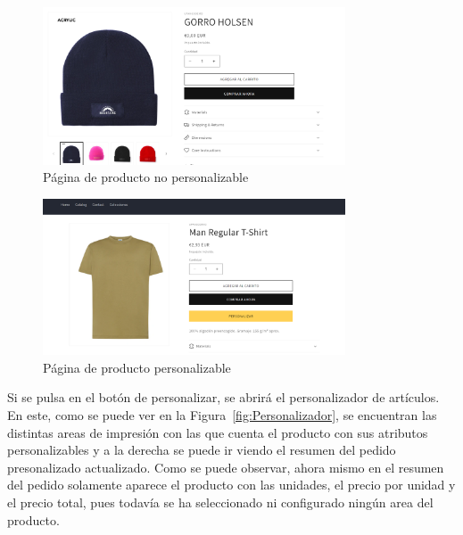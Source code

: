 \documentclass[12pt]{article}
\begin{document}
\begin{figure}[ht]
    \centering
    \includegraphics[width=0.8\textwidth]{imagenes/ManualUsuario/PaginaProductoSinPersonalizacion.png}
    \caption{\label{fig:ProductoNoPersonalizable}Página de producto no personalizable}
    \vspace{\fill}
\end{figure}

\begin{figure}[ht]
    \centering
    \includegraphics[width=0.8\textwidth]{imagenes/ManualUsuario/PaginaProductoConPersonalizacion.png}
    \caption{\label{fig:ProductoPersonalizable}Página de producto personalizable}
    \vspace{\fill}
\end{figure}

Si se pulsa en el botón de personalizar, se abrirá el personalizador de artículos. En este, como se puede ver en la Figura~\ref{fig:Personalizador}, se encuentran
las distintas areas de impresión con las que cuenta el producto con sus atributos personalizables y a la derecha se puede ir viendo el resumen del pedido presonalizado actualizado.
Como se puede observar, ahora mismo en el resumen del pedido solamente aparece el producto con las unidades, el precio por unidad y el precio total, pues todavía se ha seleccionado ni configurado
ningún area del producto.
\end{document}
